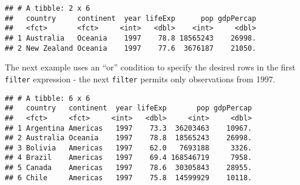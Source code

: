 \documentclass[]{book}
\newenvironment{Shaded}{\begin{snugshade}}{\end{snugshade}}
\newcommand{\KeywordTok}[1]{\textcolor[rgb]{0.13,0.29,0.53}{\textbf{#1}}}
\newcommand{\DecValTok}[1]{\textcolor[rgb]{0.00,0.00,0.81}{#1}}
\newcommand{\StringTok}[1]{\textcolor[rgb]{0.31,0.60,0.02}{#1}}
\newcommand{\OperatorTok}[1]{\textcolor[rgb]{0.81,0.36,0.00}{\textbf{#1}}}
\newcommand{\NormalTok}[1]{#1}
\begin{document}
\begin{Shaded}
\end{Shaded}

\begin{verbatim}
## # A tibble: 2 x 6
##   country     continent  year lifeExp      pop gdpPercap
##   <fct>       <fct>     <int>   <dbl>    <int>     <dbl>
## 1 Australia   Oceania    1997    78.8 18565243    26998.
## 2 New Zealand Oceania    1997    77.6  3676187    21050.
\end{verbatim}

The next example uses an ``or'' condition to specify the desired rows in
the first \texttt{filter} expression - the next \texttt{filter} permits
only observations from 1997.

\begin{Shaded}
\end{Shaded}

\begin{verbatim}
## # A tibble: 6 x 6
##   country   continent  year lifeExp       pop gdpPercap
##   <fct>     <fct>     <int>   <dbl>     <int>     <dbl>
## 1 Argentina Americas   1997    73.3  36203463    10967.
## 2 Australia Oceania    1997    78.8  18565243    26998.
## 3 Bolivia   Americas   1997    62.0   7693188     3326.
## 4 Brazil    Americas   1997    69.4 168546719     7958.
## 5 Canada    Americas   1997    78.6  30305843    28955.
## 6 Chile     Americas   1997    75.8  14599929    10118.
\end{verbatim}
\end{document}

